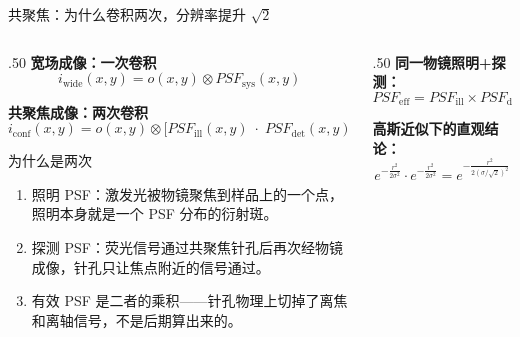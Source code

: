 \begin{frame}{共聚焦：为什么卷积两次，分辨率提升 $\sqrt{2}$}
\label{1.4b}
    \small
    \begin{columns}[T]
        \begin{column}{.50\textwidth}
            \textbf{宽场成像：一次卷积}
            \begin{equation}
                i_{\text{wide}}(x,y)=o(x,y)\otimes PSF_{\text{sys}}(x,y)
                \label{eq:widefield_main}
            \end{equation}

            \textbf{共聚焦成像：两次卷积}
            \begin{equation}
                i_{\text{conf}}(x,y)=o(x,y)\otimes
                \bigl[PSF_{\text{ill}}(x,y)\;\cdot\;PSF_{\text{det}}(x,y)\bigr]
                \label{eq:confocal_main}
            \end{equation}

            \vspace{-2pt}
            \begin{block}{为什么是两次}
                \begin{enumerate}
                    \item \alert{照明 PSF}：激发光被物镜聚焦到样品上的\alert{一个点}，照明本身就是一个 PSF 分布的衍射斑。
                    \item \alert{探测 PSF}：荧光信号通过共聚焦针孔后再次经物镜成像，针孔只让焦点附近的信号通过。
                    \item 有效 PSF 是二者的乘积——针孔\alert{物理上切掉了离焦和离轴信号}，不是后期算出来的。
                \end{enumerate}
            \end{block}
        \end{column}
        \hfill
        \begin{column}{.50\textwidth}
            \textbf{同一物镜照明+探测：}
            \begin{equation}
                PSF_{\text{eff}} = PSF_{\text{ill}} \times PSF_{\text{det}}
                \approx PSF \times PSF
                \label{eq:psf_product}
            \end{equation}

            \textbf{高斯近似下的直观结论：}
            \begin{equation}
                e^{-\frac{r^2}{2\sigma^2}} \!\cdot\!
                e^{-\frac{r^2}{2\sigma^2}}
                = e^{-\frac{r^2}{2(\sigma/\sqrt{2})^2}}
                \label{eq:gaussian_product}
            \end{equation}


\end{column}
\end{columns}
\end{frame}
